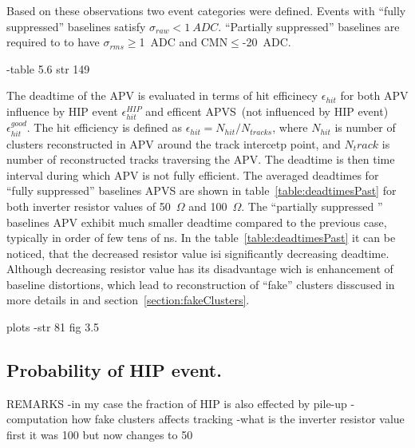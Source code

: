 Based on these observations two event categories were defined. Events with ``fully suppressed'' baselines  satisfy $\sigma_{raw}< 1~ADC$. ``Partially suppressed'' baselines are required to to have $\sigma_{rms}\geq$1~ADC and CMN$\leq$-20~ADC.

-table 5.6 str 149

The deadtime of the APV is evaluated in terms of hit efficinecy $\epsilon_{hit}$ for both APV influence by HIP event $\epsilon_{hit}^{HIP}$ and efficent APVS~(not influenced by HIP event) $\epsilon_{hit}^{good}$. The hit efficiency is defined as $\epsilon_{hit} = N_{hit}/N_{tracks}$, where $N_{hit}$ is number of clusters reconstructed in APV around the track intercetp point, and $N_track$ is number of reconstructed tracks traversing the APV. The deadtime is then time interval during which APV is not fully efficient. The averaged deadtimes for ``fully suppressed'' baselines APVS are shown in table~\ref{table:deadtimesPast} for both inverter resistor values of 50~$\Omega$ and 100~$\Omega$. The ``partially suppressed '' baselines APV exhibit much smaller deadtime compared to the previous case, typically in order of few tens of ns. In the table~\ref{table:deadtimesPast} it can be noticed, that the decreased resistor value isi significantly decreasing deadtime. Although decreasing resistor value has its disadvantage wich is enhancement of baseline distortions, which lead to reconstruction of ``fake'' clusters disscused in more details in \cite{Bainbridge:2004jc} and section~\ref{section:fakeClusters}.


plots
-str 81 fig 3.5

\subsection{Probability of HIP event.}


REMARKS
-in my case the fraction of HIP is also effected by pile-up
-computation how fake clusters affects tracking
-what is the inverter resistor value first it was 100 but now changes to 50~\cite{Gennai:2003as}
